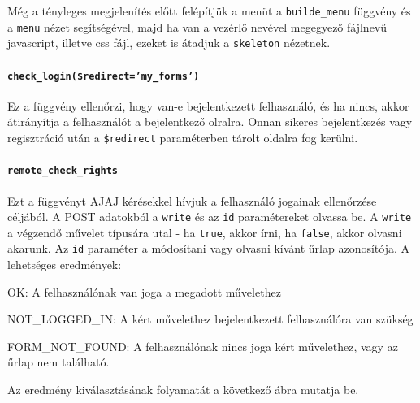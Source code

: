 \documentclass[12pt,a4paper,twoside]{article}
\newcommand{\desc}{
  \begin{description}{}{}
    \setlength\itemsep{0pt}
    \setlength\parskip{0pt}
    \setlength\topsep{0pt}
    \setlength\partopsep{0pt}
    \small}
\newcommand{\ed}{
  \end{description}
  \normalsize }
\begin{document}
Még a tényleges megjelenítés előtt felépítjük a menüt a \texttt{builde\_menu}
függvény és a \texttt{menu} nézet segítségével, majd ha van a vezérlő nevével
megegyező fájlnevű javascript, illetve css fájl, ezeket is átadjuk a
\texttt{skeleton} nézetnek.

\paragraph{\texttt{check\_login(\$redirect='my\_forms')}}
Ez a függvény ellenőrzi, hogy van-e bejelentkezett felhasználó, és ha nincs,
akkor átirányítja a felhasználót a bejelentkező olralra. Onnan sikeres
bejelentkezés vagy regisztráció után a \texttt{\$redirect} paraméterben tárolt
oldalra fog kerülni.

\paragraph{\texttt{remote\_check\_rights}}
\label{par:check_rights}

Ezt a függvényt AJAJ kérésekkel hívjuk a felhasználó jogainak ellenőrzése
céljából. A POST adatokból a \texttt{write} és az \texttt{id} paramétereket
olvassa be. A \texttt{write} a végzendő művelet típusára utal - ha
\texttt{true}, akkor írni, ha \texttt{false}, akkor olvasni akarunk.
Az \texttt{id} paraméter a módosítani vagy olvasni kívánt űrlap azonosítója.
A lehetséges eredmények:

\desc
  \item[OK:] A felhasználónak van joga a megadott művelethez
  \item[NOT\_LOGGED\_IN:] A kért művelethez bejelentkezett felhasználóra van szükség
  \item[FORM\_NOT\_FOUND:] A felhasználónak nincs joga kért művelethez, vagy az űrlap
    nem található.
\ed

Az eredmény kiválasztásának folyamatát a következő ábra mutatja be.
\end{document}
